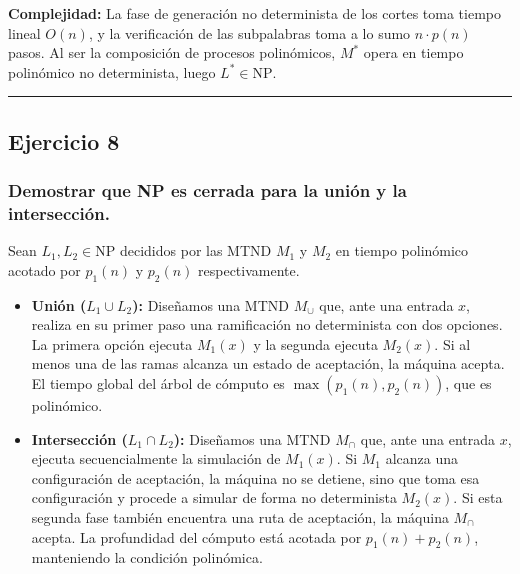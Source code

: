 \documentclass[12pt]{book} %
\providecommand{\tightlist}{%
  \setlength{\itemsep}{0pt}\setlength{\parskip}{0pt}}
\begin{document}
\textbf{Complejidad:} La fase de generación no determinista de los
cortes toma tiempo lineal \(O(n)\), y la verificación de las subpalabras
toma a lo sumo \(n \cdot p(n)\) pasos. Al ser la composición de procesos
polinómicos, \(M^*\) opera en tiempo polinómico no determinista, luego
\(L^* \in \text{NP}\).

\begin{center}\rule{0.5\linewidth}{0.5pt}\end{center}

\hypertarget{ejercicio-8}{%
\subsection{Ejercicio 8}\label{ejercicio-8}}

\hypertarget{demostrar-que-np-es-cerrada-para-la-uniuxf3n-y-la-intersecciuxf3n.}{%
\subsubsection{Demostrar que NP es cerrada para la unión y la
intersección.}\label{demostrar-que-np-es-cerrada-para-la-uniuxf3n-y-la-intersecciuxf3n.}}

Sean \(L_1, L_2 \in \text{NP}\) decididos por las MTND \(M_1\) y \(M_2\)
en tiempo polinómico acotado por \(p_1(n)\) y \(p_2(n)\)
respectivamente.

\begin{itemize}
\tightlist
\item
  \textbf{Unión (\(L_1 \cup L_2\)):} Diseñamos una MTND \(M_{\cup}\)
  que, ante una entrada \(x\), realiza en su primer paso una
  ramificación no determinista con dos opciones. La primera opción
  ejecuta \(M_1(x)\) y la segunda ejecuta \(M_2(x)\). Si al menos una de
  las ramas alcanza un estado de aceptación, la máquina acepta. El
  tiempo global del árbol de cómputo es \(\max(p_1(n), p_2(n))\), que es
  polinómico.
\item
  \textbf{Intersección (\(L_1 \cap L_2\)):} Diseñamos una MTND
  \(M_{\cap}\) que, ante una entrada \(x\), ejecuta secuencialmente la
  simulación de \(M_1(x)\). Si \(M_1\) alcanza una configuración de
  aceptación, la máquina no se detiene, sino que toma esa configuración
  y procede a simular de forma no determinista \(M_2(x)\). Si esta
  segunda fase también encuentra una ruta de aceptación, la máquina
  \(M_{\cap}\) acepta. La profundidad del cómputo está acotada por
  \(p_1(n) + p_2(n)\), manteniendo la condición polinómica.
\end{itemize}
\end{document}
